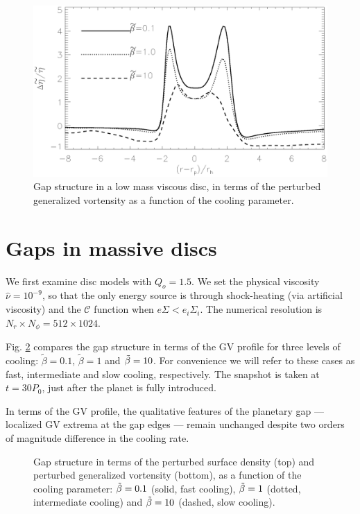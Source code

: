 \begin{figure}
  \includegraphics[scale=.42]{figures/compare_profiles_gvort020.ps}
  \caption{Gap structure in a low mass viscous disc, in terms of the
    perturbed generalized vortensity as a function of the cooling
    parameter. \label{lvisc_steady_gvort}} 
\end{figure}






\section{Gaps in massive discs}
We first examine disc models with $Q_o=1.5$. We set the physical
viscosity $\hat{\nu}=10^{-9}$, so that the only energy source is
through shock-heating (via artificial viscosity) and the $\mathcal{C}$
function when $e\Sigma<e_i\Sigma_i$. The numerical resolution is
$N_r\times N_\phi = 512\times 1024$.   

Fig. \ref{gvort1d_q1d5} compares the gap structure in terms of the GV profile for three
levels of cooling: $\tilde{\beta}=0.1$, $\tilde{\beta}=1$ and
$\tilde{\beta}=10$. For convenience we will refer to these cases as fast,
intermediate and slow cooling, respectively. The snapshot is taken at
$t=30P_0$, just after the planet is fully introduced. 

In terms of the GV profile, the qualitative features of the planetary
gap --- localized GV extrema at the gap edges --- remain unchanged
despite two orders of magnitude difference in the cooling rate.   


\begin{figure}
  \caption{Gap structure in terms of the perturbed surface density
    (top) and perturbed generalized
    vortensity (bottom), as a function of the cooling parameter:  
    $\tilde{\beta}=0.1$ (solid, fast cooling), $\tilde{\beta}=1$ (dotted,
    intermediate cooling) and $\tilde{\beta}=10$ (dashed, slow
    cooling). \label{gvort1d_q1d5}} 
\end{figure}

